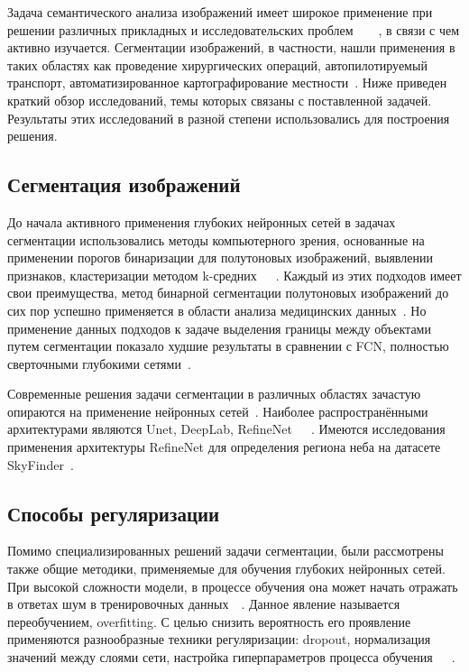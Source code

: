 Задача семантического анализа изображений имеет широкое применение при решении различных прикладных и исследовательских
проблем~\autocite{maier2018gentle}~\autocite{pan2019image}~\autocite{stabinger2020evaluating}~\autocite{li2015brief},
в связи с чем активно изучается.
Сегментации изображений, в частности, нашли применения в таких областях как проведение хирургических операций,
автопилотируемый транспорт, автоматизированное картографирование местности~\autocite{liu2018recent}.
Ниже приведен краткий обзор исследований, темы которых связаны с поставленной задачей.
Результаты этих исследований в разной степени использовались для построения решения.

\subsection{Сегментация изображений}

До начала активного применения глубоких нейронных сетей в задачах сегментации использовались методы компьютерного зрения,
основанные на применении порогов бинаризации для полутоновых изображений, выявлении признаков,
кластеризации методом k-средних~\autocite{10.5555/1888028.1888043}~\autocite{10.5555/540298}~\autocite{inproceedings}.
Каждый из этих подходов имеет свои преимущества, метод бинарной сегментации полутоновых изображений до сих пор успешно применяется
в области анализа медицинских данных~\autocite{bookMedicalImages}.
Но применение данных подходов к задаче выделения границы между объектами путем сегментации показало худшие результаты в сравнении с FCN,
полностью сверточными глубокими сетями~\autocite{7966418}.

Современные решения задачи сегментации в различных областях зачастую опираются на применение нейронных сетей~\autocite{feng2019deep}.
Наиболее распространёнными архитектурами являются Unet, DeepLab, RefineNet~\autocite{ronneberger2015unet}~\autocite{chen2016deeplab}~\autocite{lin2016refinenet}.
Имеются исследования применения архитектуры RefineNet для определения региона неба на датасете SkyFinder~\autocite{place2017segmenting}.

\subsection{Способы регуляризации}

Помимо специализированных решений задачи сегментации, были рассмотрены также общие методики, применяемые для обучения глубоких нейронных сетей.
При высокой сложности модели, в процессе обучения она может начать отражать в ответах шум в тренировочных данных~\autocite{salman2019overfitting}~\autocite{ghojogh2019theory}.
Данное явление называется переобучением, overfitting.
С целью снизить вероятность его проявление применяются разнообразные техники регуляризации: dropout, нормализация значений между слоями сети,
настройка гиперпараметров процесса обучения~\autocite{smith2018disciplined}~\autocite{labach2019survey}~\autocite{ioffe2015batch}.

